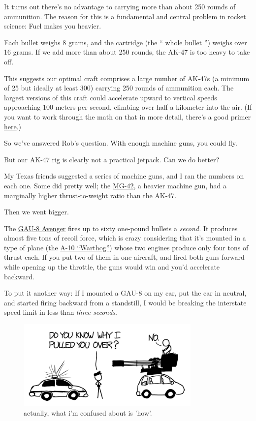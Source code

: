 {It turns out there’s no advantage to carrying more than about 250 rounds of ammunition. The reason for this is a fundamental and central problem in rocket science: Fuel makes you heavier.}

{Each bullet weighs 8 grams, and the cartridge (the “ \href{https://www.youtube.com/watch?v=GGPIQ72-2Vg}{whole bullet} ”) weighs over 16 grams. If we add more than about 250 rounds, the AK-47 is too heavy to take off.}

{This suggests our optimal craft comprises a large number of AK-47s (a minimum of 25 but ideally at least 300) carrying 250 rounds of ammunition each. The largest versions of this craft could accelerate upward to vertical speeds approaching 100 meters per second, climbing over half a kilometer into the air. (If you want to work through the math on that in more detail, there’s a good primer \href{http://ocw.mit.edu/courses/aeronautics-and-astronautics/16-07-dynamics-fall-2009/lecture-notes/MIT16\_07F09\_Lec14.pdf}{here}.)}

{So we’ve answered Rob’s question. With enough machine guns, you could fly.}

{But our AK-47 rig is clearly not a practical jetpack. Can we do better?}

{My Texas friends suggested a series of machine guns, and I ran the numbers on each one. Some did pretty well; the \href{http://en.wikipedia.org/wiki/MG\_42}{MG-42}, a heavier machine gun, had a marginally higher thrust-to-weight ratio than the AK-47.}

{Then we went bigger.}

{The \href{http://en.wikipedia.org/wiki/GAU-8\_Avenger}{GAU-8 Avenger} fires up to sixty one-pound bullets a \emph{second.} It produces almost five tons of recoil force, which is crazy considering that it’s mounted in a type of plane (the \href{http://en.wikipedia.org/wiki/A-10\_Thunderbolt\_II}{A-10 “Warthog”}) whose two engines produce only four tons of thrust each. If you put two of them in one aircraft, and fired both guns forward while opening up the throttle, the guns would win and you’d accelerate backward.}

{To put it another way: If I mounted a GAU-8 on my car, put the car in neutral, and started firing backward from a standstill, I would be breaking the interstate speed limit in less than \emph{three seconds}.}

\begin{figure}[!htbp]
\centering
\includegraphics[scale=0.5, max width=0.8\textwidth]{imgs/a/21/jetpack_speeding.png}
\caption{actually, what i'm confused about is 'how'.}
\end{figure}

